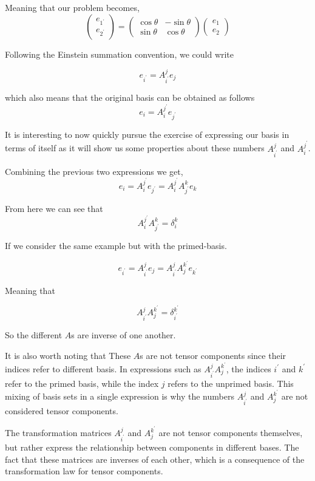 Meaning that our problem becomes,
$$
\begin{pmatrix}
e_{1^\prime} \\
e_{2^\prime}
\end{pmatrix}
=
\begin{pmatrix}
\cos\theta & - \sin\theta \\
\sin\theta & \cos\theta
\end{pmatrix}
\begin{pmatrix}
e_1 \\
e_2
\end{pmatrix}
$$

Following the Einstein summation convention, we could write

$$
e_{i^\prime} = A_{i^\prime}^{j} e_j
$$

which also means that the original basis can be obtained as follows
$$
e_{i} = A_{i}^{j^\prime} e_{j^\prime}
$$

It is interesting to now quickly pursue the exercise of expressing our basis in terms of itself
as it will show us some properties about these numbers $A_{i^\prime}^{j}$ and $A_{i}^{j^\prime}$.


Combining the previous two expressions we get,
$$
e_{i} = A_{i}^{j^\prime} e_{j^\prime}
= A_{i}^{j^\prime} A_{j^\prime}^{k} e_k
$$

From here we can see that
$$
A_{i}^{j^\prime} A_{j^\prime}^{k} = \delta_{i}^{k}
$$

If we consider the same example but with the primed-basis.

$$
e_{i^\prime} = A_{i^\prime}^{j} e_j 
= A_{i^\prime}^{j} A_{j}^{k^\prime} e_{k^\prime}
$$

Meaning that

$$
A_{i^\prime}^{j} A_{j}^{k^\prime} = \delta_{i^\prime}^{k^\prime}
$$

So the different $A$s are inverse of one another.

It is also worth noting that These $A$s are not tensor components since their indices refer to different basis.
In expressions such as $A_{i^{\prime}}^{j} A_{j}^{k^{\prime}}$, the indices $i^{\prime}$ and $k^{\prime}$ refer
to the primed basis, while the index $j$ refers to the unprimed basis.
This mixing of basis sets in a single expression is why the numbers $A_{i^{\prime}}^{j}$ and $A_{j}^{k^{\prime}}$
are not considered tensor components.

The transformation matrices $A_{i^{\prime}}^{j}$ and $A_{j}^{k^{\prime}}$ are not tensor components themselves,
but rather express the relationship between components in different bases.
The fact that these matrices are inverses of each other, which is a consequence of the transformation law for
tensor components.

